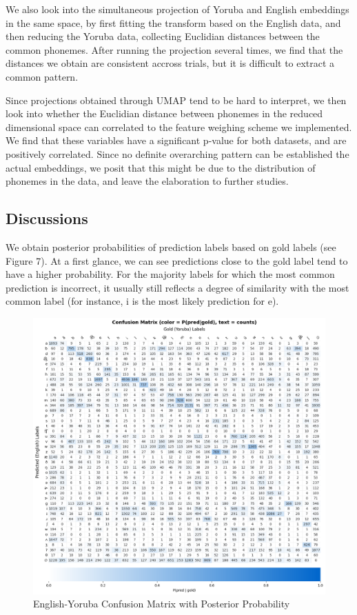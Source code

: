 \documentclass[11pt]{article}
\begin{document}
{We also look into the simultaneous projection of Yoruba and English embeddings in the same space, by first fitting the transform based on the English data, and then reducing the Yoruba data, collecting
Euclidian distances between the common phonemes. After running the projection several times, we find that the distances we obtain are consistent accross trials, but it is difficult to extract a common pattern.

Since projections obtained through UMAP tend to be hard to interpret, we then look into whether the Euclidian distance between phonemes in the reduced dimensional space can correlated to the feature weighing scheme we implemented.
We find that these variables have a significant p-value for both datasets, and are positively correlated. Since no definite overarching pattern can be established the actual embeddings, we posit that this might be due to the distribution of phonemes in the data,
and leave the elaboration to further studies. 	

\subsection{Discussions}

We obtain posterior probabilities of prediction labels based on gold labels (see Figure 7). At a first glance, we can see predictions close to the gold label tend to have a higher probability. For the majority labels for which the most common prediction is incorrect, it usually still reflects a degree of similarity with the most common label (for instance, i is the most likely prediction for e).

\begin{figure}
    \centering
    \includegraphics[width=1\linewidth]{EngYorConfusionMatrix.png}
    \caption{English-Yoruba Confusion Matrix with Posterior Probability}
    \label{fig:placeholder}
\end{figure}

}
\end{document}
